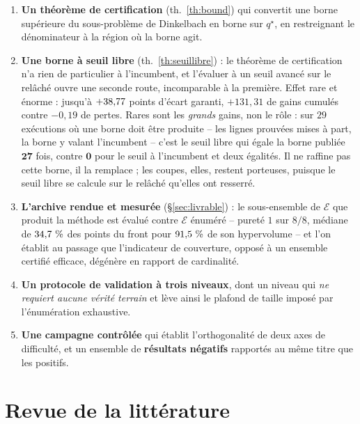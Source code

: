 \documentclass[11pt,a4paper]{article}
\theoremstyle{plain}
\theoremstyle{remark}
\newcommand{\Ecal}{\mathcal{E}}
\newcommand{\qs}{q^{\star}}
\begin{document}
\begin{enumerate}[leftmargin=*,itemsep=2pt]
      borne n'ait été évaluée. La coupe de dominance ne peut jamais la
      produire, puisqu'elle \emph{préserve} $\Ecal$. C'est la signature de
      l'hybridation : la partie exacte y conclut sur des points que seule la
      partie heuristique a su trouver.
\item \textbf{Un théorème de certification} (th.~\ref{th:bound}) qui convertit
      une borne supérieure du sous-problème de Dinkelbach en borne sur $\qs$,
      en restreignant le dénominateur à la région où la borne agit.
\item \textbf{Une borne à seuil libre} (th.~\ref{th:seuillibre}) : le
      théorème de certification n'a rien de particulier à l'incumbent, et
      l'évaluer à un seuil avancé sur le relâché ouvre une seconde route,
      incomparable à la première. Effet rare et énorme : jusqu'à $+38{,}77{}$
      points d'écart garanti, $+131{,}31$ de gains cumulés contre $-0{,}19$
      de pertes. Rares sont les \emph{grands} gains, non le rôle : sur $29$
      exécutions où une borne doit être produite -- les lignes prouvées mises
      à part, la borne y valant l'incumbent -- c'est le seuil libre qui égale
      la borne publiée $\mathbf{27}$ fois, contre $\mathbf{0}$ pour le seuil à
      l'incumbent et deux égalités. Il ne raffine pas cette borne, il la
      remplace ; les coupes, elles, restent porteuses, puisque le seuil libre
      se calcule sur le relâché qu'elles ont resserré.
\item \textbf{L'archive rendue et mesurée} (\S\ref{sec:livrable}) : le
      sous-ensemble de $\Ecal$ que produit la méthode est évalué contre
      $\Ecal$ énuméré -- pureté $1$ sur $8/8$, médiane de $34{,}7{}\ \%$ des
      points du front pour $91{,}5{}\ \%$ de son hypervolume -- et l'on
      établit au passage que l'indicateur de couverture, opposé à un
      ensemble certifié efficace, dégénère en rapport de cardinalité.
\item \textbf{Un protocole de validation à trois niveaux}, dont un niveau qui
      \emph{ne requiert aucune vérité terrain} et lève ainsi le plafond de
      taille imposé par l'énumération exhaustive.
\item \textbf{Une campagne contrôlée} qui établit l'orthogonalité de deux
      axes de difficulté, et un ensemble de \textbf{résultats négatifs}
      rapportés au même titre que les positifs.
\end{enumerate}

\section{Revue de la littérature}
\label{sec:revue}
\end{document}
